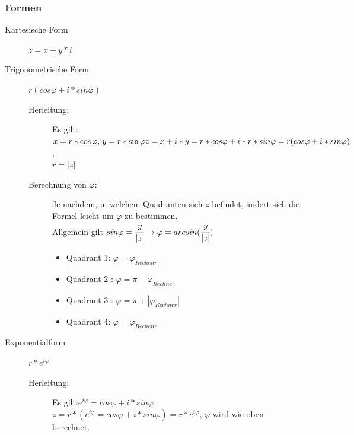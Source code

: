 \documentclass[a4paper]{scrartcl}
\begin{document}
            \subsubsection{Formen}    
                \begin{description}
                    \item[Kartesische Form] $z = x + y*i$
                    \item[Trigonometrische Form]   $r(cos\varphi + i*sin\varphi)$
                    \begin{description}
                        \item[Herleitung:]  Es gilt: \(x = r * \cos\varphi, \, y = r * \sin\varphi \\
                        z = x + i*y = r * cos\varphi + i * r* sin\varphi = r(cos\varphi + i*sin\varphi) \), 
                        \\ $r = |z|$ 
                        \item[Berechnung von $\varphi$:] Je nachdem, in welchem Quadranten sich $z$ befindet, ändert sich die Formel leicht um $\varphi$ zu bestimmen.\\
                            Allgemein gilt $sin \varphi = \cfrac{y}{|z|} \rightarrow \varphi = arcsin(\cfrac{y}{|z|})$
                        \begin{itemize}
                            \item Quadrant 1: $\varphi = \varphi_{Rechenr}$
                            \item Quadrant 2 : $\varphi = \pi - \varphi_{Rechner}$
                            \item Quadrant 3 : $\varphi = \pi + |\varphi_{Rechner}|$
                            \item Quadrant 4: $\varphi = \varphi_{Rechenr}$
                        \end{itemize}
                    \end{description}
                    \newpage
                    \item[Exponentialform] $r * e^{i\varphi}$ 
                    \begin{description}
                        \item[Herleitung:] Es gilt:\(e^{i\varphi} = cos\varphi + i * sin\varphi \) \\ \(z = r * (e^{i\varphi} = cos\varphi + i * sin\varphi) = r * e^{i\varphi} \), $\varphi$ wird wie oben berechnet.
                    \end{description}
                \end{description}          
\end{document}
